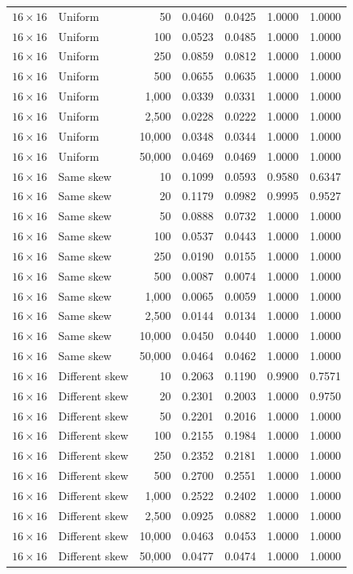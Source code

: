 \begin{longtable}{@{}llrrrrr@{}}
\(16\times16\) & Uniform & 50 & 0.0460 & 0.0425 & 1.0000 & 1.0000\\
\(16\times16\) & Uniform & 100 & 0.0523 & 0.0485 & 1.0000 & 1.0000\\
\(16\times16\) & Uniform & 250 & 0.0859 & 0.0812 & 1.0000 & 1.0000\\
\(16\times16\) & Uniform & 500 & 0.0655 & 0.0635 & 1.0000 & 1.0000\\
\(16\times16\) & Uniform & 1,000 & 0.0339 & 0.0331 & 1.0000 & 1.0000\\
\(16\times16\) & Uniform & 2,500 & 0.0228 & 0.0222 & 1.0000 & 1.0000\\
\(16\times16\) & Uniform & 10,000 & 0.0348 & 0.0344 & 1.0000 & 1.0000\\
\(16\times16\) & Uniform & 50,000 & 0.0469 & 0.0469 & 1.0000 & 1.0000\\
\(16\times16\) & Same skew & 10 & 0.1099 & 0.0593 & 0.9580 & 0.6347\\
\(16\times16\) & Same skew & 20 & 0.1179 & 0.0982 & 0.9995 & 0.9527\\
\(16\times16\) & Same skew & 50 & 0.0888 & 0.0732 & 1.0000 & 1.0000\\
\(16\times16\) & Same skew & 100 & 0.0537 & 0.0443 & 1.0000 & 1.0000\\
\(16\times16\) & Same skew & 250 & 0.0190 & 0.0155 & 1.0000 & 1.0000\\
\(16\times16\) & Same skew & 500 & 0.0087 & 0.0074 & 1.0000 & 1.0000\\
\(16\times16\) & Same skew & 1,000 & 0.0065 & 0.0059 & 1.0000 & 1.0000\\
\(16\times16\) & Same skew & 2,500 & 0.0144 & 0.0134 & 1.0000 & 1.0000\\
\(16\times16\) & Same skew & 10,000 & 0.0450 & 0.0440 & 1.0000 & 1.0000\\
\(16\times16\) & Same skew & 50,000 & 0.0464 & 0.0462 & 1.0000 & 1.0000\\
\(16\times16\) & Different skew & 10 & 0.2063 & 0.1190 & 0.9900 & 0.7571\\
\(16\times16\) & Different skew & 20 & 0.2301 & 0.2003 & 1.0000 & 0.9750\\
\(16\times16\) & Different skew & 50 & 0.2201 & 0.2016 & 1.0000 & 1.0000\\
\(16\times16\) & Different skew & 100 & 0.2155 & 0.1984 & 1.0000 & 1.0000\\
\(16\times16\) & Different skew & 250 & 0.2352 & 0.2181 & 1.0000 & 1.0000\\
\(16\times16\) & Different skew & 500 & 0.2700 & 0.2551 & 1.0000 & 1.0000\\
\(16\times16\) & Different skew & 1,000 & 0.2522 & 0.2402 & 1.0000 & 1.0000\\
\(16\times16\) & Different skew & 2,500 & 0.0925 & 0.0882 & 1.0000 & 1.0000\\
\(16\times16\) & Different skew & 10,000 & 0.0463 & 0.0453 & 1.0000 & 1.0000\\
\(16\times16\) & Different skew & 50,000 & 0.0477 & 0.0474 & 1.0000 & 1.0000\\
\midrule
\bottomrule
\end{longtable}
